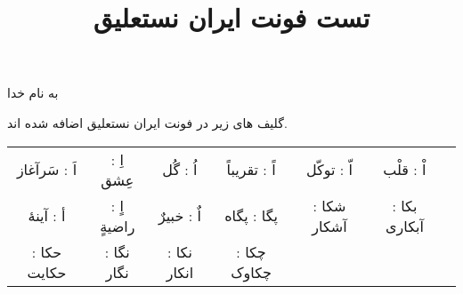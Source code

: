 \documentclass[14pt,a4paper]{article}
\begin{document}
\title{تست فونت ایران نستعلیق}
\author{ }
\date{ }
\maketitle

\begin{center}
به نام خدا
\end{center}

گلیف های زیر در فونت ایران نستعلیق اضافه شده اند.

\begin{tabular}{c c c c c c c}
 اَ : سَرآغاز & اِ : عِشق & اُ :‌ گُل & اً : تقریباً & اّ : توکّل & اْ : قلْب
\\
 أ : آینهٔ & اٍ : راضیةٍ & اٌ : خبیرٌ & پگا : پگاه & شکا : آشکار & بکا : آبکاری
\\
  حکا : حکایت & نگا : نگار & نکا : انکار & چکا : چکاوک & &
\end{tabular}
\end{document}
